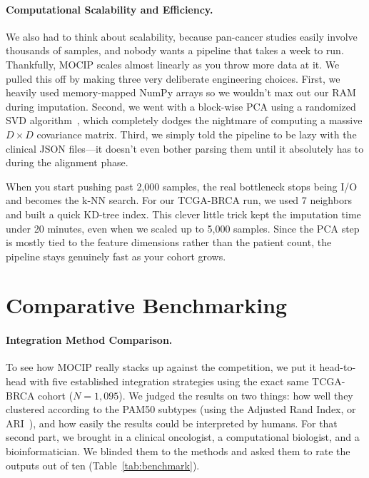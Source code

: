 \documentclass[runningheads]{llncs}
\begin{document}
\paragraph{Computational Scalability and Efficiency.}
We also had to think about scalability, because pan-cancer studies easily involve thousands of samples, and nobody wants a pipeline that takes a week to run. Thankfully, MOCIP scales almost linearly as you throw more data at it. We pulled this off by making three very deliberate engineering choices. First, we heavily used memory-mapped NumPy arrays so we wouldn't max out our RAM during imputation. Second, we went with a block-wise PCA using a randomized SVD algorithm~\cite{pedregosa2011}, which completely dodges the nightmare of computing a massive $D \times D$ covariance matrix. Third, we simply told the pipeline to be lazy with the clinical JSON files---it doesn't even bother parsing them until it absolutely has to during the alignment phase.

When you start pushing past 2,000 samples, the real bottleneck stops being I/O and becomes the k-NN search. For our TCGA-BRCA run, we used 7 neighbors and built a quick KD-tree index. This clever little trick kept the imputation time under 20 minutes, even when we scaled up to 5,000 samples. Since the PCA step is mostly tied to the feature dimensions rather than the patient count, the pipeline stays genuinely fast as your cohort grows.

\section{Comparative Benchmarking}

\label{sec:bench}
\paragraph{Integration Method Comparison.}
To see how MOCIP really stacks up against the competition, we put it head-to-head with five established integration strategies using the exact same TCGA-BRCA cohort ($N=1{,}095$). We judged the results on two things: how well they clustered according to the PAM50 subtypes (using the Adjusted Rand Index, or ARI~\cite{wang2021evaluation}), and how easily the results could be interpreted by humans. For that second part, we brought in a clinical oncologist, a computational biologist, and a bioinformatician. We blinded them to the methods and asked them to rate the outputs out of ten (Table~\ref{tab:benchmark}).
\end{document}
